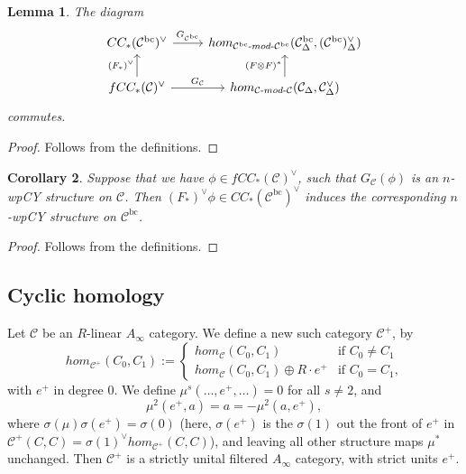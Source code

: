 \documentclass{article}
\newtheorem{lem}{Lemma}[section]
\newtheorem{cor}[lem]{Corollary}
\def\bc{\mathsf{bc}}
\def\cC{\mathcal{C}}
\def\bc{{\operatorname{bc}}}
\newcommand{\bimod}[2]{{{#1}\text{-}mod\text{-}{#2}}}
\begin{document}
\begin{lem}\label{lem:wpcy_cd}
    The diagram
    $$\begin{tikzcd}
        CC_*(\cC^\bc)^\vee \ar[r,"G_{\cC^\bc}"]  & hom_{\bimod{\cC^\bc}{\cC^\bc}}(\cC^\bc_\Delta,(\cC^\bc)_\Delta^\vee) \\
        fCC_*(\cC)^\vee \ar[r,"G_\cC"]\ar[u,"(F_*)^\vee"] & hom_{\bimod{\cC}{\cC}}(\cC_\Delta,\cC_\Delta^\vee) \ar[u,"(F \otimes F)^*"] 
    \end{tikzcd}$$
    commutes.
\end{lem}
\begin{proof}
    Follows from the definitions.
\end{proof}

\begin{cor}\label{lem:wpcy_gc}
    Suppose that we have $\phi \in fCC_*(\cC)^\vee$, such that $G_\cC(\phi)$ is an $n$-wpCY structure on $\cC$. 
    Then $(F_*)^\vee \phi \in CC_*(\cC^\bc)^\vee$ induces the corresponding $n$-wpCY structure on $\cC^\bc$.
\end{cor}
\begin{proof}
    Follows from the definitions.
\end{proof}

\subsection{Cyclic homology}\label{sec:cyc}

Let $\cC$ be an $R$-linear $A_\infty$ category. 
We define a new such category $\cC^+$, by 
$$ hom_{\cC^+}(C_0,C_1) := \begin{cases}
                            hom_\cC(C_0,C_1) & \text{if $C_0 \neq C_1$}\\
                            hom_\cC(C_0,C_1) \oplus R \cdot e^+ & \text{if $C_0=C_1$,}
\end{cases}  
$$
with $e^+$ in degree $0$. 
We define $\mu^s(\ldots, e^+,\ldots) = 0$ for all $s \neq 2$, and 
$$\mu^2( e^+,a) = a = -\mu^2(a, e^+),$$
where $\sigma(\mu) \sigma(e^+) = \sigma(0)$ (here, $\sigma(e^+)$ is the $\sigma(1)$ out the front of $e^+$ in $\cC^+(C,C) = \sigma(1)^\vee hom_{\cC^+}(C,C)$), and leaving all other structure maps $\mu^*$ unchanged.
Then $\cC^+$ is a strictly unital filtered $A_\infty$ category, with strict units $e^+$. 
\end{document}
